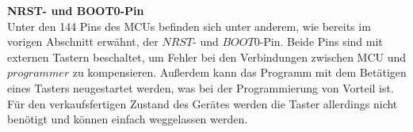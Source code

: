 \newline
\textbf{NRST- und BOOT0-Pin}\\
Unter den 144 Pins des MCUs befinden sich unter anderem, wie bereits im vorigen Abschnitt erwähnt, der $NRST$- und $BOOT0$-Pin. Beide Pins sind mit externen Tastern beschaltet, um Fehler bei den Verbindungen zwischen MCU und $programmer$ zu kompensieren. Außerdem kann das Programm mit dem Betätigen eines Tasters neugestartet werden, was bei der Programmierung von Vorteil ist. Für den verkaufsfertigen Zustand des Gerätes werden die Taster allerdings nicht benötigt und können einfach weggelassen werden. 